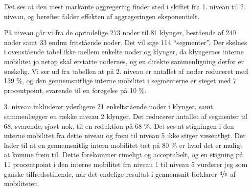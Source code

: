 Det ses at den mest markante aggregering finder sted i skiftet fra 1. niveau til 2. niveau, og herefter falder effekten af aggregeringen eksponentielt. 

På niveau går vi fra de oprindelige 273 noder til 81 klynger, bestående af 240 noder samt 33 endnu fritstående noder. Det vil sige 114 “segmenter”. Der skelnes i ovenstående tabel ikke mellem enkelte noder og klynger, da klyngernes interne mobilitet jo netop skal erstatte nodernes, og en direkte sammenligning derfor er ønskelig.
Vi ser ud fra tabellen at på 2. niveau er antallet af noder reduceret med 139 \%, og den gennemsnitlige interne mobilitet i segmenterne er steget med 7 procentpoint, svarende til en forøgelse på 10 \%. 

3. niveau inkluderer yderligere 21 enkeltstående noder i klynger, samt sammenlægger en række niveau 2 klynger. Det reducerer antallet af segmenter til 68, svarende, sjovt nok, til en reduktion på 68 \%. Det ses at stigningen i den interne mobilitet fra dette niveau og frem til niveau 5 ikke stiger væsentligt. Det lader til at en gennemsnitlig intern mobilitet tæt på 80 \% er hvad det er muligt at komme frem til. Dette forekommer rimeligt og acceptabelt, og en stigning på 11 procentpoint i den interne mobilitet fra niveau 1 til niveau 5 vurderer jeg som ganske tilfredsstillende, når det endelige resultat i gennemsnit forklarer $\nicefrac{4}{5}$ af mobiliteten. 

